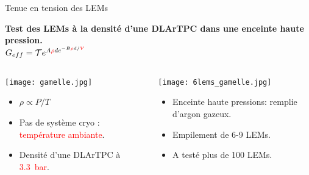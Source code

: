     \begin{frame}{Tenue en tension des LEMs}
    	\begin{scriptsize}
    		\begin{center}
    			\textbf{Test des LEMs à la densité d'une DLArTPC dans une enceinte haute pression.}\\
    			$G _{eff}= \mathcal{T}e^{A\textcolor{red}{\rho} d e^{-B\textcolor{red}{\rho}d/\textcolor{red}{V}}}$
    		\end{center} 
    		\begin{columns}
		    	\begin{column}{0.5\textwidth}
		    		\texttt{[image: gamelle.jpg]}\\
		    		\begin{itemize}
		    			\item $\rho \propto P/T$
		    			\item Pas de système cryo : \textcolor{red}{température ambiante}.
		    			\item Densité d'une DLArTPC à \textcolor{red}{\SI{3.3}{\bar}}.
		    		\end{itemize}
		    	\end{column}\hfill
		    	\begin{column}{0.5\textwidth}
		    		\texttt{[image: 6lems\_gamelle.jpg]}\\
		    		\begin{itemize}
		    			\item Enceinte haute pressions: remplie d'argon gazeux.
		    			\item Empilement de 6-9 LEMs.
		    			\item A testé plus de 100 LEMs.
		    		\end{itemize}
		    	\end{column}
		    \end{columns}
	    \end{scriptsize} 
    \end{frame}

